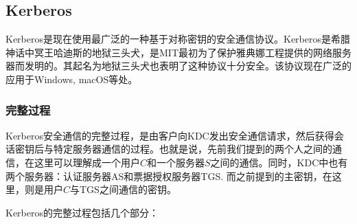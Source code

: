 \subsection{Kerberos}
Kerberos是现在使用最广泛的一种基于对称密钥的安全通信协议。Kerberos是希腊神话中冥王哈迪斯的地狱三头犬，是MIT最初为了保护雅典娜工程提供的网络服务器而发明的。其起名为地狱三头犬也表明了这种协议十分安全。该协议现在广泛的应用于Windows, macOS等处。
\subsubsection{完整过程}
Kerberos安全通信的完整过程，是由客户向KDC发出安全通信请求，然后获得会话密钥后与特定服务器通信的过程。也就是说，先前我们提到的两个人之间的通信，在这里可以理解成一个用户$C$和一个服务器$S$之间的通信。同时，KDC中也有两个服务器：认证服务器AS和票据授权服务器TGS. 而之前提到的主密钥，在这里，则是用户$C$与TGS之间通信的密钥。\par
Kerberos的完整过程包括几个部分：
